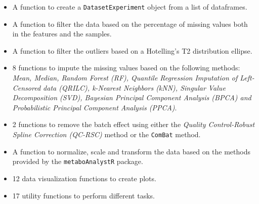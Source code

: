 \documentclass[ENG, BIB]{TFUOC}%
\begin{document}
\begin{itemize}    
    \item A function to create a \texttt{DatasetExperiment} object from a list of dataframes.
    \item A function to filter the data based on the percentage of missing values both in the features and the samples.  
    \item A function to filter the outliers based on a Hotelling's T2 distribution ellipse.
    \item 8 functions to impute the missing values based on the following methods: \textit{Mean, Median, Random Forest (RF), Quantile Regression Imputation of Left-Censored data (QRILC), k-Nearest Neighbors (kNN), Singular Value Decomposition (SVD), Bayesian Principal Component Analysis (BPCA) and Probabilistic Principal Component Analysis (PPCA)}.
    \item 2 functions to remove the batch effect using either the \textit{Quality Control-Robust Spline Correction (QC-RSC)} method or the \texttt{ComBat} method. 
    \item A function to normalize, scale and transform the data based on the methods provided by the \texttt{metaboAnalystR} package.
    \item 12 data visualization functions to create plots. 
    \item 17 utility functions to perform different tasks. 
\end{itemize}
    
\end{document}
